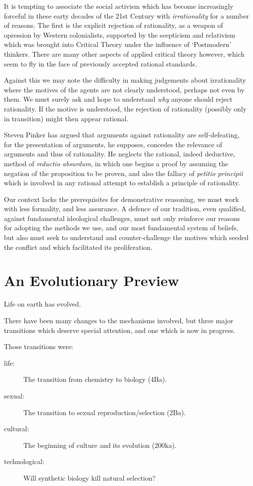 \documentclass[10pt,titlepage]{book}
\begin{document}
It is tempting to associate the social activism which has become increasingly forceful in these earty decades of the 21st Century with \emph{irrationality} for a number of reasons.
The first is the explicit rejection of rationality, as a weapon of opression by Western colonialists, supported by the scepticism and relativism which was brought into Critical Theory under the influence of `Postmodern' thinkers.
There are many other aspects of applied critical theory however, which seem to fly in the face of previously accepted rational standards.

Against this we may note the difficulty in making judgements about irrationality where the motives of the agents are not clearly understood, perhaps not even by them.
We must surely ask and hope to understand \emph{why} anyone should reject rationality.
If the motive is understood, the rejection of rationality (possibly only in transition) might then appear rational.

Steven Pinker has argued that arguments against rationality are self-defeating, for the presentation of arguments, he supposes, concedes the relevance of arguments and thus of rationality.
He neglects the rational, indeed deductive, method of \emph{reductio absurdum}, in which one begins a proof by assuming the negation of the proposition to be proven, and also the fallacy of \emph{petitio principii} which is involved in any rational attempt to establish a principle of rationality.

Our context lacks the prerequisites for demonstrative reasoning, we must work with less formality, and less assurance.
A defence of our tradition, even qualified, against fundamental ideological challenges, must not only reinforce our reasons for adopting the methods we use, and our most fundamental system of beliefs, but also must seek to understand and counter-challenge the motives which seeded the conflict and which facilitated its proliferation.

\section{An Evolutionary Preview}

Life on earth has evolved.

There have been many changes to the mechanisms involved, but three major transitions which deserve special attention, and one which is now in progress.

Those transitions were:

\begin{description}
\item[life:] The transition from chemistry to biology (4Ba).
\item[sexual:] The transition to sexual reproduction/selection (2Ba).
\item[cultural:] The beginning of culture and its evolution (200ka).
\item[technological:] Will synthetic biology kill natural selection?
\end{description}
\end{document}
